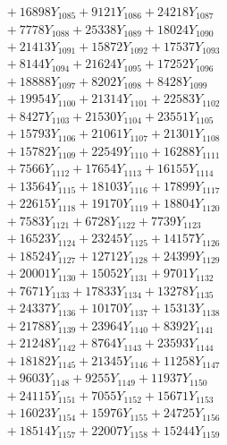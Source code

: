 \documentclass[a4paper,10pt]{article}
\begin{document}
{\begin{align}
&\;  + 16898 Y_{1085} + 9121 Y_{1086} + 24218 Y_{1087} \\[0.3ex]
&\;  + 7778 Y_{1088} + 25338 Y_{1089} + 18024 Y_{1090} \\[0.3ex]
&\;  + 21413 Y_{1091} + 15872 Y_{1092} + 17537 Y_{1093} \\[0.3ex]
&\;  + 8144 Y_{1094} + 21624 Y_{1095} + 17252 Y_{1096} \\[0.3ex]
&\;  + 18888 Y_{1097} + 8202 Y_{1098} + 8428 Y_{1099} \\[0.3ex]
&\;  + 19954 Y_{1100} + 21314 Y_{1101} + 22583 Y_{1102} \\[0.3ex]
&\;  + 8427 Y_{1103} + 21530 Y_{1104} + 23551 Y_{1105} \\[0.3ex]
&\;  + 15793 Y_{1106} + 21061 Y_{1107} + 21301 Y_{1108} \\[0.5ex]\allowbreak
&\;  + 15782 Y_{1109} + 22549 Y_{1110} + 16288 Y_{1111} \\[0.3ex]
&\;  + 7566 Y_{1112} + 17654 Y_{1113} + 16155 Y_{1114} \\[0.3ex]
&\;  + 13564 Y_{1115} + 18103 Y_{1116} + 17899 Y_{1117} \\[0.3ex]
&\;  + 22615 Y_{1118} + 19170 Y_{1119} + 18804 Y_{1120} \\[0.3ex]
&\;  + 7583 Y_{1121} + 6728 Y_{1122} + 7739 Y_{1123} \\[0.3ex]
&\;  + 16523 Y_{1124} + 23245 Y_{1125} + 14157 Y_{1126} \\[0.3ex]
&\;  + 18524 Y_{1127} + 12712 Y_{1128} + 24399 Y_{1129} \\[0.3ex]
&\;  + 20001 Y_{1130} + 15052 Y_{1131} + 9701 Y_{1132} \\[0.3ex]
&\;  + 7671 Y_{1133} + 17833 Y_{1134} + 13278 Y_{1135} \\[0.3ex]
&\;  + 24337 Y_{1136} + 10170 Y_{1137} + 15313 Y_{1138} \\[0.5ex]\allowbreak
&\;  + 21788 Y_{1139} + 23964 Y_{1140} + 8392 Y_{1141} \\[0.3ex]
&\;  + 21248 Y_{1142} + 8764 Y_{1143} + 23593 Y_{1144} \\[0.3ex]
&\;  + 18182 Y_{1145} + 21345 Y_{1146} + 11258 Y_{1147} \\[0.3ex]
&\;  + 9603 Y_{1148} + 9255 Y_{1149} + 11937 Y_{1150} \\[0.3ex]
&\;  + 24115 Y_{1151} + 7055 Y_{1152} + 15671 Y_{1153} \\[0.3ex]
&\;  + 16023 Y_{1154} + 15976 Y_{1155} + 24725 Y_{1156} \\[0.3ex]
&\;  + 18514 Y_{1157} + 22007 Y_{1158} + 15244 Y_{1159} \\[0.3ex]

\end{align}}
\end{document}

